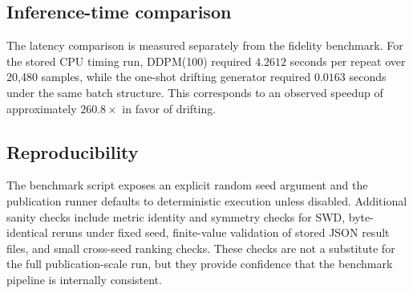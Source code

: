\subsection{Inference-time comparison}
The latency comparison is measured separately from the fidelity benchmark.
For the stored CPU timing run, DDPM(100) required \(4.2612\) seconds per repeat over 20,480 samples, while the one-shot drifting generator required \(0.0163\) seconds under the same batch structure.
This corresponds to an observed speedup of approximately \(260.8\times\) in favor of drifting.

\subsection{Reproducibility}
The benchmark script exposes an explicit random seed argument and the publication runner defaults to deterministic execution unless disabled.
Additional sanity checks include metric identity and symmetry checks for SWD, byte-identical reruns under fixed seed, finite-value validation of stored JSON result files, and small cross-seed ranking checks.
These checks are not a substitute for the full publication-scale run, but they provide confidence that the benchmark pipeline is internally consistent.
